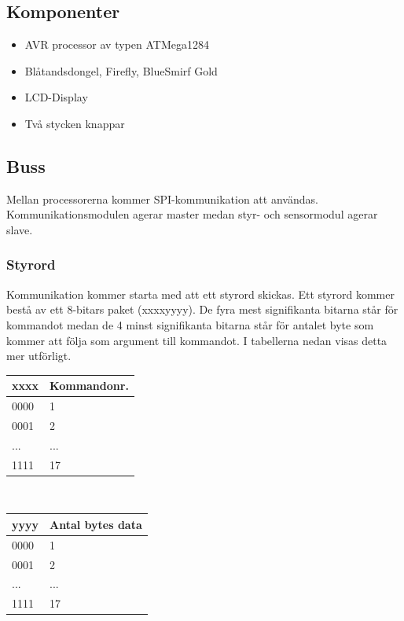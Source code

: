 \documentclass[a4paper,12pt,fleqn]{article}
\begin{document}
 
\subsection{Komponenter}
\begin{itemize}
  \item AVR processor av typen ATMega1284
  \item Blåtandsdongel, Firefly, BlueSmirf Gold
  \item LCD-Display
  \item Två stycken knappar
\end{itemize}

\subsection{Buss}
Mellan processorerna kommer SPI-kommunikation att användas. Kommunikationsmodulen agerar master medan styr- och sensormodul agerar slave. 

\subsubsection{Styrord}
Kommunikation kommer starta med att ett styrord skickas. Ett styrord kommer bestå av ett 8-bitars paket (xxxxyyyy). De fyra mest signifikanta bitarna står för kommandot medan de 4 minst signifikanta bitarna står för antalet byte som kommer att följa som argument till kommandot. I tabellerna nedan visas detta mer utförligt. \\

 \begin{tabular}{| p{3cm} | p{3.5cm} |}
	    \hline
		\textbf{xxxx} & \textbf{Kommandonr.} \\ \hline
		0000 & 1 \\ \hline
		0001 & 2 \\ \hline
		... & ... \\ \hline
		1111 & 17 \\ \hline
	    \end{tabular}
		\\

 \begin{tabular}{| p{3cm} | p{3.5cm} |}
	    \hline
		\textbf{yyyy} & \textbf{Antal bytes data} \\ \hline
		0000 & 1 \\ \hline
		0001 & 2 \\ \hline
		... & ... \\ \hline
		1111 & 17 \\ \hline
	    \end{tabular}
		\vspace{0.5cm}
		
\end{document}
